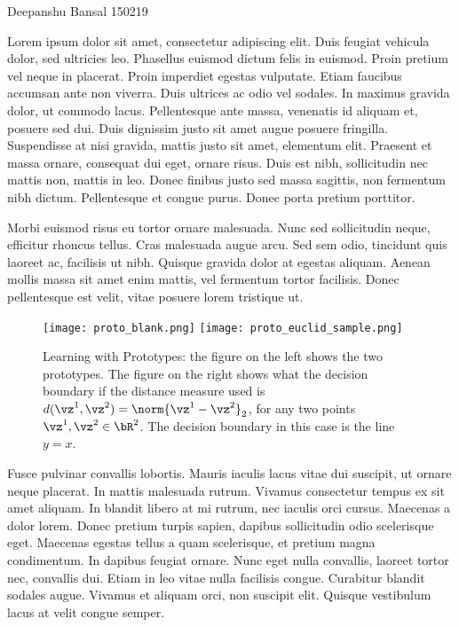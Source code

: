 \documentclass[a4paper,11pt]{article}
\begin{document}
{Deepanshu Bansal}      						           		%
{150219}																		%

\begin{mlsolution}


Lorem ipsum dolor sit amet, consectetur adipiscing elit. Duis feugiat vehicula dolor, sed ultricies leo. Phasellus euismod dictum felis in euismod. Proin pretium vel neque in placerat. Proin imperdiet egestas vulputate. Etiam faucibus accumsan ante non viverra. Duis ultrices ac odio vel sodales. In maximus gravida dolor, ut commodo lacus. Pellentesque ante massa, venenatis id aliquam et, posuere sed dui. Duis dignissim justo sit amet augue posuere fringilla. Suspendisse at nisi gravida, mattis justo sit amet, elementum elit. Praesent et massa ornare, consequat dui eget, ornare risus. Duis est nibh, sollicitudin nec mattis non, mattis in leo. Donec finibus justo sed massa sagittis, non fermentum nibh dictum. Pellentesque et congue purus. Donec porta pretium porttitor.

Morbi euismod risus eu tortor ornare malesuada. Nunc sed sollicitudin neque, efficitur rhoncus tellus. Cras malesuada augue arcu. Sed sem odio, tincidunt quis laoreet ac, facilisis ut nibh. Quisque gravida dolor at egestas aliquam. Aenean mollis massa sit amet enim mattis, vel fermentum tortor facilisis. Donec pellentesque est velit, vitae posuere lorem tristique ut.
\begin{figure}[th]%
\centering
\texttt{[image: proto\_blank.png]}%
\hfill
\texttt{[image: proto\_euclid\_sample.png]}%
\caption{Learning with Prototypes: the figure on the left shows the two prototypes. The figure on the right shows what the decision boundary if the distance measure used is $d(\vz^1,\vz^2) = \norm{\vz^1-\vz^2}_2$, for any two points $\vz^1,\vz^2 \in \bR^2$. The decision boundary in this case is the line $y = x$.}%
\label{fig:proto}%
\end{figure}
Fusce pulvinar convallis lobortis. Mauris iaculis lacus vitae dui suscipit, ut ornare neque placerat. In mattis malesuada rutrum. Vivamus consectetur tempus ex sit amet aliquam. In blandit libero at mi rutrum, nec iaculis orci cursus. Maecenas a dolor lorem. Donec pretium turpis sapien, dapibus sollicitudin odio scelerisque eget. Maecenas egestas tellus a quam scelerisque, et pretium magna condimentum. In dapibus feugiat ornare. Nunc eget nulla convallis, laoreet tortor nec, convallis dui. Etiam in leo vitae nulla facilisis congue. Curabitur blandit sodales augue. Vivamus et aliquam orci, non suscipit elit. Quisque vestibulum lacus at velit congue semper.

\end{mlsolution}
\end{document}
